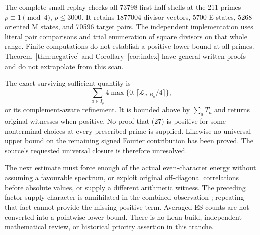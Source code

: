 The complete small replay checks all 73798 first-half shells at the 211 primes
$p\equiv1\pmod4$, $p\le3000$. It retains 1877004 divisor vectors, 5700 E states,
5268 oriented M states, and 70596 target pairs. The independent implementation
uses literal pair comparisons and trial enumeration of square divisors on that
whole range. Finite computations do not establish a positive lower bound at all
primes. Theorem~\ref{thm:negative} and Corollary~\ref{cor:index} have general
written proofs and do not extrapolate from this scan.

The exact surviving sufficient quantity is
\[
 \sum_{a\in I_p}4\max\{0,\lceil\mathcal L_{a,B_a}/4\rceil\},
                                                               \tag{27}
\]
or its complement-aware refinement. It is bounded above by $\sum_aT_a$ and
returns original witnesses when positive. No proof that (27) is positive for
some nonterminal choices at every prescribed prime is supplied. Likewise no
universal upper bound on the remaining signed Fourier contribution has been
proved. The source's requested universal closure is therefore unresolved.

The next estimate must force enough of the actual even-character
energy without assuming a favourable spectrum, or exploit original off-diagonal correlations before absolute values, or
supply a different arithmetic witness. The preceding factor-supply character
is annihilated in the combined observation \cite[\S4, ``The source character is annihilated'']{Turn5}; repeating
that fact cannot provide the missing positive term. Averaged ES counts
\cite[Theorem 1.1 and Remark 1.2]{ET} are not converted into a pointwise lower
bound. There is no Lean build, independent mathematical review, or historical
priority assertion in this tranche.
